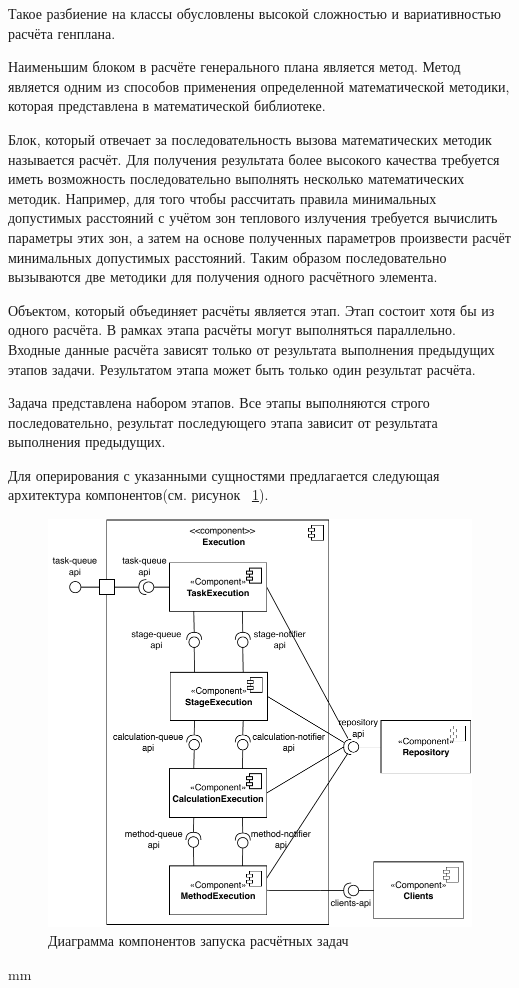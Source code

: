 Такое разбиение на классы обусловлены высокой сложностью и вариативностью расчёта генплана.

Наименьшим блоком в расчёте генерального плана является метод. Метод является одним из способов применения
определенной математической методики, которая представлена в математической библиотеке.

Блок, который отвечает за последовательность вызова математических методик называется расчёт.
Для получения результата более высокого качества требуется иметь возможность последовательно выполнять несколько
математических методик.
Например, для того чтобы рассчитать правила минимальных допустимых расстояний с учётом зон теплового излучения
требуется вычислить параметры этих зон, а затем на основе полученных параметров произвести расчёт минимальных
допустимых расстояний. Таким образом последовательно вызываются две методики для получения одного расчётного элемента.

Объектом, который объединяет расчёты является этап. Этап состоит хотя бы из одного расчёта. В рамках этапа
расчёты могут выполняться параллельно. Входные данные расчёта зависят только от результата выполнения предыдущих этапов
задачи. Результатом этапа может быть только один результат расчёта.

Задача представлена набором этапов. Все этапы выполняются строго последовательно, результат последующего этапа
зависит от результата выполнения предыдущих.

Для оперирования с указанными сущностями предлагается следующая архитектура
компонентов(см. рисунок \ \ref{pic:architecture__orchestrator-detailed-component}).

\begin{figure}[H]
	\includegraphics[width=\textwidth]{pictures/component_detailed}
	\caption{Диаграмма компонентов запуска расчётных задач}
	\label{pic:architecture__orchestrator-detailed-component}
\end{figure}
 mm

